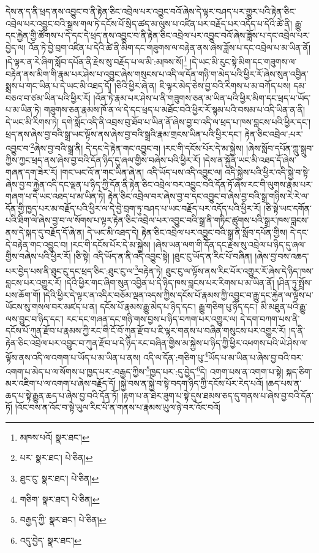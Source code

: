 དེས་ན་ད་ནི་ཕྲད་ནས་འབྱུང་བ་ནི་རྟེན་ཅིང་འབྲེལ་པར་འབྱུང་བའོ་ཞེས་དེ་ལྟར་བཤད་པར་གྱུར་པའི་རྟེན་ཅིང་འབྲེལ་པར་འབྱུང་བའི་སྒྲས་གལ་ཏེ་དངོས་པོ་སྲིད་ཚད་མ་ལུས་པ་འཛིན་པར་བརྗོད་པར་འདོད་པ་དེའི་ཚེ་ནི། རྒྱུ་དང་རྐྱེན་གྱི་ཚོགས་པ་དེ་དང་དེ་ཕྲད་ནས་འབྱུང་བ་ནི་རྟེན་ཅིང་འབྲེལ་པར་འབྱུང་བའོ་ཞེས་ཟློས་པ་དང་འབྲེལ་པར་བྱེད་ལ། འོན་ཏེ་བྱེ་བྲག་འཛིན་པ་དེའི་ཚེ་ནི་མིག་དང་གཟུགས་ལ་བརྟེན་ནས་ཞེས་ཟློས་པ་དང་འབྲེལ་པ་མ་ཡིན་ནོ། །དེ་ལྟར་ན་རེ་ཞིག་སློབ་དཔོན་ནི་རྗེས་སུ་བརྗོད་པ་ལ་མི་:མཁས་སོ།\footnote{མཁས་པའོ།  སྣར་ཐང་། } །དེ་ཡང་མི་རུང་སྟེ་མིག་དང་གཟུགས་ལ་བརྟེན་ནས་མིག་གི་རྣམ་པར་ཤེས་པ་འབྱུང་ཞེས་གསུངས་པ་འདི་ལ་དོན་གཉི་ག་མེད་པའི་ཕྱིར་རོ་ཞེས་སུན་འབྱིན་སྨྲས་པ་གང་ཡིན་པ་དེ་ཡང་མི་འཐད་དོ། །ཅིའི་ཕྱིར་ཞེ་ན། ཇི་ལྟར་མེད་ཅེས་བྱ་བའི་རིགས་པ་མ་བཀོད་པས། དམ་བཅའ་བ་ཙམ་ཡིན་པའི་ཕྱིར་རོ། །འོན་ཏེ་རྣམ་པར་ཤེས་པ་ནི་གཟུགས་ཅན་མ་ཡིན་པའི་ཕྱིར་མིག་དང་ཕྲད་པ་ཡོད་པ་མ་ཡིན་ཏེ། གཟུགས་ཅན་རྣམས་ཁོ་ན་ལ་དེ་དང་ཕྲད་པ་མཐོང་བའི་ཕྱིར་རོ་སྙམ་པའི་བསམ་པ་འདི་ཡིན་ན་ནི། དེ་ཡང་མི་རིགས་ཏེ། དགེ་སློང་འདི་ནི་འབྲས་བུ་ཐོབ་པ་ཡིན་ནོ་ཞེས་བྱ་བ་འདི་ལ་ཕྲད་པ་ཁས་བླངས་པའི་ཕྱིར་དང་། ཕྲད་ནས་ཞེས་བྱ་བའི་སྒྲ་ཡང་ལྟོས་ནས་ཞེས་བྱ་བའི་སྒྲའི་རྣམ་གྲངས་ཡིན་པའི་ཕྱིར་དང་། རྟེན་ཅིང་འབྲེལ་:པར་འབྱུང་བ་\footnote{པར་  སྣར་ཐང་།  པེ་ཅིན། }ཞེས་བྱ་བའི་སྒྲ་ནི། དེ་དང་དེ་རྟེན་གང་འབྱུང་བ། །རང་གི་དངོས་པོར་དེ་མ་སྐྱེས། །ཞེས་སློབ་དཔོན་ཀླུ་སྒྲུབ་ཀྱིས་ཀྱང་ཕྲད་ནས་ཞེས་བྱ་བའི་དོན་ཉིད་དུ་ཞལ་གྱིས་བཞེས་པའི་ཕྱིར་རོ། །དེས་ན་སྐྱོན་ཡང་མི་འཐད་དོ་ཞེས་གཞན་དག་ཟེར་རོ། །གང་ཡང་འོ་ན་གང་ཡིན་ཞེ་ན། འདི་ཡོད་པས་འདི་འབྱུང་ལ། འདི་སྐྱེས་པའི་ཕྱིར་འདི་སྐྱེ་བ་སྟེ་ཞེས་བྱ་བ་རྐྱེན་འདི་དང་ལྡན་པ་ཉིད་ཀྱི་དོན་ནི་རྟེན་ཅིང་འབྲེལ་བར་འབྱུང་བའི་དོན་ཏོ་ཞེས་རང་གི་ལུགས་རྣམ་པར་གཞག་པ་དེ་ཡང་འཐད་པ་མ་ཡིན་ཏེ། རྟེན་ཅིང་འབྲེལ་བར་ཞེས་བྱ་བ་དང་འབྱུང་བ་ཞེས་བྱ་བའི་སྒྲ་གཉིས་རེ་རེ་ལ་དོན་གྱི་ཁྱད་པར་མ་བརྗོད་པའི་ཕྱིར་ལ་དེ་བྱེ་བྲག་ཏུ་བཤད་པ་ཡང་བརྗོད་པར་འདོད་པའི་ཕྱིར་རོ། །ཅི་སྟེ་ཡང་དགོན་པའི་ཐིག་ལེ་ཞེས་བྱ་བ་ལ་སོགས་པ་ལྟར་རྟེན་ཅིང་འབྲེལ་པར་འབྱུང་བའི་སྒྲ་ནི་གཏིང་ཚུགས་པའི་སྒྲར་ཁས་བླངས་ནས་དེ་སྐད་དུ་བརྗོད་དོ་ཞེ་ན། དེ་ཡང་མི་འཐད་དེ། རྟེན་ཅིང་འབྲེལ་པར་འབྱུང་བའི་སྒྲ་ནི་སློབ་དཔོན་གྱིས། དེ་དང་དེ་བརྟེན་གང་འབྱུང་བ། །རང་གི་དངོས་པོར་དེ་མ་སྐྱེས། །ཞེས་ཡན་ལག་གི་དོན་དང་རྗེས་སུ་འབྲེལ་པ་ཉིད་དུ་ཞལ་གྱིས་བཞེས་པའི་ཕྱིར་རོ། །ཅི་སྟེ། འདི་ཡོད་ན་ནི་འདི་འབྱུང་སྟེ། །ཐུང་ངུ་ཡོད་ན་རིང་པོ་བཞིན། །ཞེས་བྱ་བས་འཆད་པར་བྱེད་པས་ནི་ཐུང་ངུ་དང་ཕྲད་ཅིང་:ཐུང་ངུ་ལ་\footnote{ཐུང་ངུ་  སྣར་ཐང་།  པེ་ཅིན། }བརྟེན་ཏེ། ཐུང་ངུ་ལ་ལྟོས་ནས་རིང་པོར་འགྱུར་རོ་ཞེས་དེ་ཉིད་ཁས་བླངས་པར་འགྱུར་རོ། །དེའི་ཕྱིར་གང་ཞིག་སུན་འབྱིན་པ་དེ་ཉིད་ཁས་བླངས་པར་རིགས་པ་མ་ཡིན་ནོ། །ཤིན་ཏུ་སྤྲོས་པས་ཆོག་གོ། །དེའི་ཕྱིར་དེ་ལྟར་ན་འདིར་བཅོམ་ལྡན་འདས་ཀྱིས་དངོས་པོ་རྣམས་ཀྱི་འབྱུང་བ་རྒྱུ་དང་རྐྱེན་ལ་ལྟོས་པ་ཡོངས་སུ་གསལ་བར་མཛད་པ་ན། དངོས་པོ་རྣམས་རྒྱུ་མེད་པ་ཉིད་དང་། རྒྱུ་གཅིག་པུ་ཉིད་དང་། མི་མཐུན་པའི་རྒྱུ་ལས་བྱུང་བ་ཉིད་དང་། རང་དང་གཞན་དང་གཉི་གས་བྱས་པ་ཉིད་བཀག་པར་འགྱུར་ལ། དེ་དག་བཀག་པས་ནི་དངོས་པོ་ཀུན་རྫོབ་པ་རྣམས་ཀྱི་རང་གི་ངོ་བོ་ཀུན་རྫོབ་པ་ཇི་ལྟར་གནས་པ་བཞིན་གསུངས་པར་འགྱུར་རོ། །ད་ནི་རྟེན་ཅིང་འབྲེལ་པར་འབྱུང་བ་ཀུན་རྫོབ་པ་དེ་ཉིད་རང་བཞིན་གྱིས་མ་སྐྱེས་པ་ཉིད་ཀྱི་ཕྱིར་འཕགས་པའི་ཡེ་ཤེས་ལ་ལྟོས་ནས་འདི་ལ་འགག་པ་ཡོད་པ་མ་ཡིན་པ་ནས། འདི་ལ་དོན་:གཅིག་པུ་\footnote{གཅིག་  སྣར་ཐང་།  པེ་ཅིན། }ཡོད་པ་མ་ཡིན་པ་ཞེས་བྱ་བའི་བར་འགག་པ་མེད་པ་ལ་སོགས་པ་ཁྱད་པར་:བརྒྱད་ཀྱིས་\footnote{བརྒྱད་ཀྱི་  སྣར་ཐང་།  པེ་ཅིན། }ཁྱད་པར་:དུ་བྱེད་\footnote{འདུ་བྱེད་  སྣར་ཐང་། }དེ། འགག་པས་ན་འགག་པ་སྟེ། སྐད་ཅིག་མར་འཇིག་པ་ལ་འགག་པ་ཞེས་བརྗོད་དོ། །སྐྱེ་བས་ན་སྐྱེ་བ་སྟེ་བདག་ཉིད་ཀྱི་དངོས་པོར་རེད་པའོ། །ཆད་པས་ན་ཆད་པ་སྟེ་རྒྱུན་ཆད་པ་ཞེས་བྱ་བའི་དོན་ཏོ། །རྟག་པ་ན་ཐེར་ཟུག་པ་སྟེ་དུས་ཐམས་ཅད་དུ་གནས་པ་ཞེས་བྱ་བའི་དོན་ཏོ། །འོང་བས་ན་འོང་བ་སྟེ་ཡུལ་རིང་པོ་ན་གནས་པ་རྣམས་ཡུལ་ཉེ་བར་འོང་བའོ། 